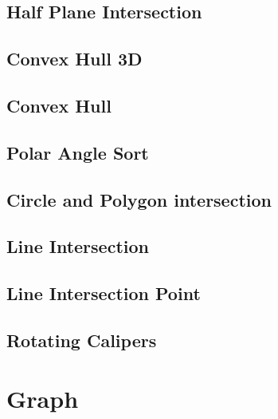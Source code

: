 \documentclass[a4paper,10pt,twocolumn,oneside]{article}
\begin{document}
\subsection{Half Plane Intersection}


%

\subsection{Convex Hull 3D}


\subsection{Convex Hull}


\subsection{Polar Angle Sort}


\subsection{Circle and Polygon intersection}


\subsection{Line Intersection}


\subsection{Line Intersection Point}


\subsection{Rotating Calipers}


\section{Graph}
\end{document}
